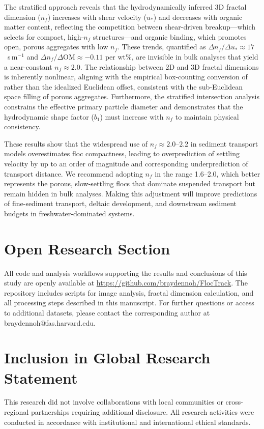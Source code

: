 \documentclass{agujournal2019}
\begin{document}
The stratified approach reveals that the hydrodynamically inferred 3D fractal dimension ($n_f$) increases with shear velocity ($u_*$) and decreases with organic matter content, reflecting the competition between shear-driven breakup---which selects for compact, high-$n_f$ structures---and organic binding, which promotes open, porous aggregates with low $n_f$. These trends, quantified as $\Delta n_f / \Delta u_* \approx 17$~s\,m$^{-1}$ and $\Delta n_f / \Delta \mathrm{OM} \approx -0.11$ per wt\%, are invisible in bulk analyses that yield a near-constant $n_f \approx 2.0$. The relationship between 2D and 3D fractal dimensions is inherently nonlinear, aligning with the empirical box-counting conversion of  rather than the idealized Euclidean offset, consistent with the sub-Euclidean space filling of porous aggregates. Furthermore, the stratified intersection analysis constrains the effective primary particle diameter and demonstrates that the hydrodynamic shape factor ($b_1$) must increase with $n_f$ to maintain physical consistency.

These results show that the widespread use of $n_f \approx 2.0$--$2.2$ in sediment transport models overestimates floc compactness, leading to overprediction of settling velocity by up to an order of magnitude and corresponding underprediction of transport distance. We recommend adopting $n_f$ in the range 1.6--2.0, which better represents the porous, slow-settling flocs that dominate suspended transport but remain hidden in bulk analyses. Making this adjustment will improve predictions of fine-sediment transport, deltaic development, and downstream sediment budgets in freshwater-dominated systems.

\section*{Open Research Section}
All code and analysis workflows supporting the results and conclusions of this study are openly available at \url{https://github.com/braydennoh/FlocTrack}. The repository includes scripts for image analysis, fractal dimension calculation, and all processing steps described in this manuscript. For further questions or access to additional datasets, please contact the corresponding author at braydennoh@fas.harvard.edu.

\section*{Inclusion in Global Research Statement}
This research did not involve collaborations with local communities or cross-regional partnerships requiring additional disclosure. All research activities were conducted in accordance with institutional and international ethical standards.
\end{document}
